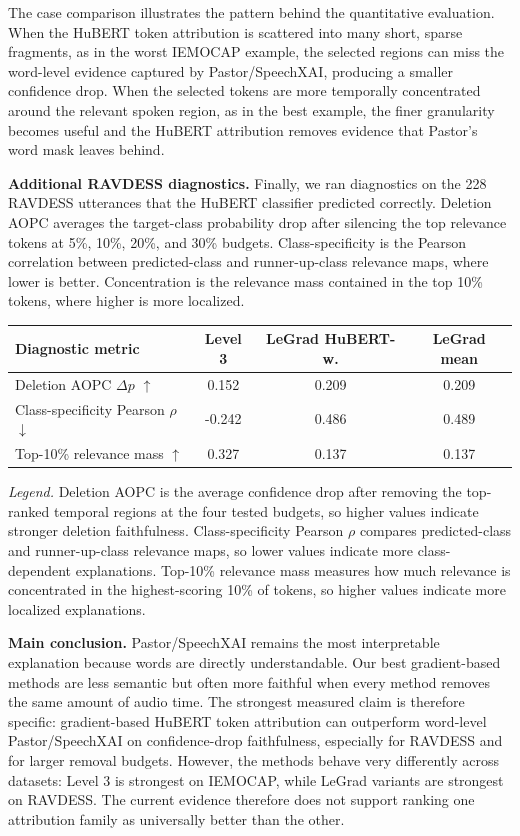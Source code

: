 \documentclass[10pt]{article}
\begin{document}
The case comparison illustrates the pattern behind the quantitative evaluation. When the HuBERT token attribution is scattered into many short, sparse fragments, as in the worst IEMOCAP example, the selected regions can miss the word-level evidence captured by Pastor/SpeechXAI, producing a smaller confidence drop. When the selected tokens are more temporally concentrated around the relevant spoken region, as in the best example, the finer granularity becomes useful and the HuBERT attribution removes evidence that Pastor's word mask leaves behind.

\textbf{Additional RAVDESS diagnostics.} Finally, we ran diagnostics on the 228 RAVDESS utterances that the HuBERT classifier predicted correctly. Deletion AOPC averages the target-class probability drop after silencing the top relevance tokens at 5\%, 10\%, 20\%, and 30\% budgets. Class-specificity is the Pearson correlation between predicted-class and runner-up-class relevance maps, where lower is better. Concentration is the relevance mass contained in the top 10\% tokens, where higher is more localized.

\begin{center}
\small
\begin{tabular}{@{}lccc@{}}
\toprule
Diagnostic metric & Level 3 & LeGrad HuBERT-w. & LeGrad mean \\
\midrule
Deletion AOPC \(\Delta p\) \(\uparrow\) & 0.152 & 0.209 & 0.209 \\
Class-specificity Pearson \(\rho\) \(\downarrow\) & -0.242 & 0.486 & 0.489 \\
Top-10\% relevance mass \(\uparrow\) & 0.327 & 0.137 & 0.137 \\
\bottomrule
\end{tabular}
\end{center}
\vspace{-0.4em}
{\small \emph{Legend.} Deletion AOPC is the average confidence drop after removing the top-ranked temporal regions at the four tested budgets, so higher values indicate stronger deletion faithfulness. Class-specificity Pearson \(\rho\) compares predicted-class and runner-up-class relevance maps, so lower values indicate more class-dependent explanations. Top-10\% relevance mass measures how much relevance is concentrated in the highest-scoring 10\% of tokens, so higher values indicate more localized explanations.}

\textbf{Main conclusion.} Pastor/SpeechXAI remains the most interpretable explanation because words are directly understandable. Our best gradient-based methods are less semantic but often more faithful when every method removes the same amount of audio time. The strongest measured claim is therefore specific: gradient-based HuBERT token attribution can outperform word-level Pastor/SpeechXAI on confidence-drop faithfulness, especially for RAVDESS and for larger removal budgets. However, the methods behave very differently across datasets: Level 3 is strongest on IEMOCAP, while LeGrad variants are strongest on RAVDESS. The current evidence therefore does not support ranking one attribution family as universally better than the other.
\end{document}
